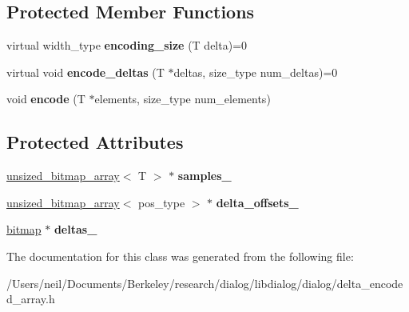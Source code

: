 \subsection*{Protected Member Functions}
\begin{DoxyCompactItemize}
\item 
\mbox{\label{classdialog_1_1delta__encoded__array_a5a7dd4499765ed12a030b25ca3452ea3}} 
virtual width\+\_\+type {\bfseries encoding\+\_\+size} (T delta)=0
\item 
\mbox{\label{classdialog_1_1delta__encoded__array_a4ad7e0110c90c91684873f40c778cd6e}} 
virtual void {\bfseries encode\+\_\+deltas} (T $\ast$deltas, size\+\_\+type num\+\_\+deltas)=0
\item 
\mbox{\label{classdialog_1_1delta__encoded__array_aaab973ffb4fa2d62fb658e5dbcc0acad}} 
void {\bfseries encode} (T $\ast$elements, size\+\_\+type num\+\_\+elements)
\end{DoxyCompactItemize}
\subsection*{Protected Attributes}
\begin{DoxyCompactItemize}
\item 
\mbox{\label{classdialog_1_1delta__encoded__array_af92d09ac19d1c6ac9f9271b0fc857404}} 
\hyperlink{classdialog_1_1unsized__bitmap__array}{unsized\+\_\+bitmap\+\_\+array}$<$ T $>$ $\ast$ {\bfseries samples\+\_\+}
\item 
\mbox{\label{classdialog_1_1delta__encoded__array_ad2ca110a0d18668bc6503effd89eb8a8}} 
\hyperlink{classdialog_1_1unsized__bitmap__array}{unsized\+\_\+bitmap\+\_\+array}$<$ pos\+\_\+type $>$ $\ast$ {\bfseries delta\+\_\+offsets\+\_\+}
\item 
\mbox{\label{classdialog_1_1delta__encoded__array_ab1b64295148db2954a85757aad6865cf}} 
\hyperlink{classdialog_1_1bitmap}{bitmap} $\ast$ {\bfseries deltas\+\_\+}
\end{DoxyCompactItemize}


The documentation for this class was generated from the following file\+:\begin{DoxyCompactItemize}
\item 
/\+Users/neil/\+Documents/\+Berkeley/research/dialog/libdialog/dialog/delta\+\_\+encoded\+\_\+array.\+h\end{DoxyCompactItemize}
